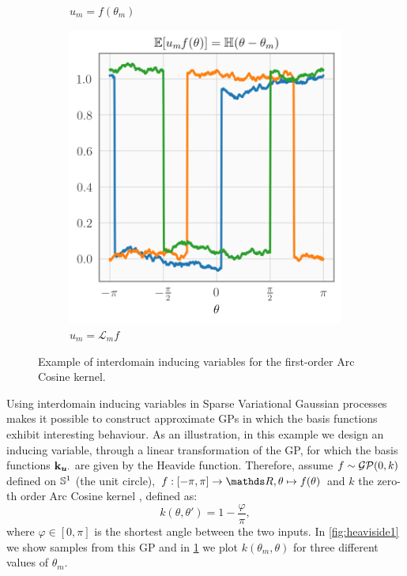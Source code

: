 \begin{figure}[tbh!]
\begin{subfigure}{0.3\textwidth}
  \caption{$u_m = f(\theta_m)$}
  \label{fig:heaviside2}
\end{subfigure}\hfil %
\begin{subfigure}{0.3\textwidth}
  \includegraphics[width=\textwidth]{heaviside3}
  \caption{$u_m = \mathcal{L}_m f$}
  \label{fig:heaviside3}
\end{subfigure}
\caption{Example of interdomain inducing variables for the first-order Arc Cosine kernel.}
\label{fig:images}
\end{figure}

Using interdomain inducing variables in Sparse Variational Gaussian processes makes it possible to construct approximate GPs in which the basis functions exhibit interesting behaviour. As an illustration, in this example we design an inducing variable, through a linear transformation of the GP, for which the basis functions $\mathbf{k}_{\bm{u} \cdot}$ are given by the Heavide function. Therefore, assume $f \sim \mathcal{GP}(0, k)$ defined on $\mathbb{S}^1$ (the unit circle), $f: [-\pi, \pi] \rightarrow \Reals, \theta \mapsto f(\theta)$ and $k$ the zero-th order Arc Cosine kernel \citep{cho2009kernel}, defined as:
\begin{equation}
  k(\theta, \theta') = 1 - \frac{\varphi}{\pi},
\end{equation}
where $\varphi \in [0, \pi]$ is the shortest angle between the two inputs. In \cref{fig:heaviside1} we show samples from this GP and in \cref{fig:heaviside2} we plot $k(\theta_m, \theta)$ for three different values of $\theta_m$.

